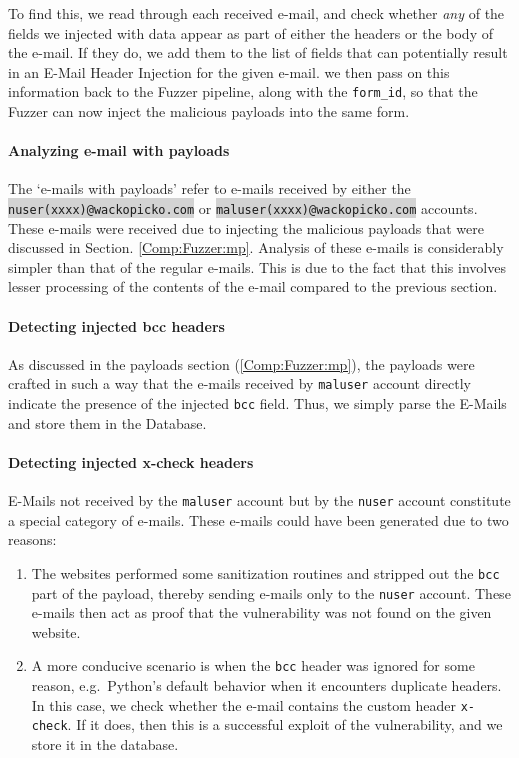 To find this, we read through each received e-mail, and check whether \emph{any} of the fields we injected with data appear as part of either the headers or the body of the e-mail. If they do, we add them to the list of fields that can potentially result in an E-Mail Header Injection for the given e-mail. we then pass on this information back to the Fuzzer pipeline, along with the \texttt{form\_id}, so that the Fuzzer can now inject the malicious payloads into the same form.

\paragraph{Analyzing e-mail with payloads}
The `e-mails with payloads' refer to e-mails received by either the \colorbox{lightgray}{\lstinline{nuser(xxxx)@wackopicko.com}} or \colorbox{lightgray}{\lstinline{maluser(xxxx)@wackopicko.com}} accounts. These e-mails were received due to injecting the malicious payloads that were discussed in Section. \ref{Comp:Fuzzer:mp}. Analysis of these e-mails is considerably simpler than that of the regular e-mails. This is due to the fact that this involves lesser processing of the contents of the e-mail compared to the previous section.
\paragraph{Detecting injected bcc headers}
As discussed in the payloads section (\ref{Comp:Fuzzer:mp}), the payloads were crafted in such a way that the e-mails received by \texttt{maluser} account directly indicate the presence of the injected \texttt{bcc} field. Thus, we simply parse the E-Mails and store them in the Database.

\label{analyze:detect_x_check}
\paragraph{Detecting injected x-check headers}
E-Mails not received by the \texttt{maluser} account but by the \texttt{nuser} account constitute a special category of e-mails.
These e-mails could have been generated due to two reasons:
\begin{enumerate}
	\item The websites performed some sanitization routines and stripped out the \texttt{bcc} part of the payload, thereby sending e-mails only to the \texttt{nuser} account. These e-mails then act as proof that the vulnerability was not found on the given website.
	\item A more conducive scenario is when the \texttt{bcc} header was ignored for some reason, e.g.\ Python's default behavior when it encounters duplicate headers. In this case, we check whether the e-mail contains the custom header \texttt{x-check}. If it does, then this is a successful exploit of the vulnerability, and we store it in the database.
\end{enumerate}
